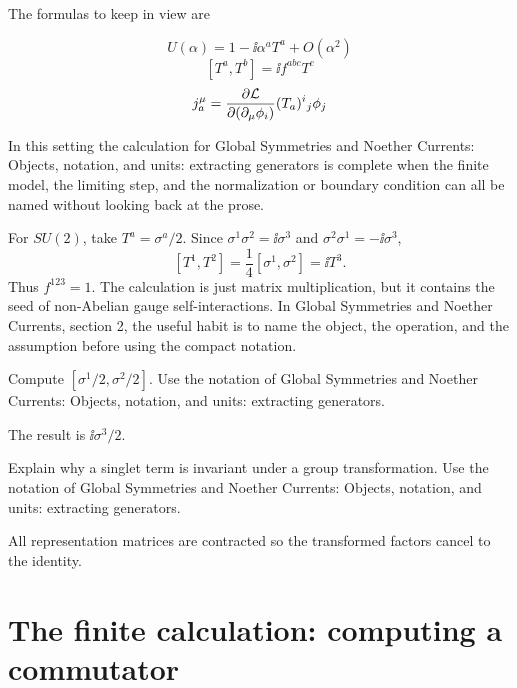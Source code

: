 The formulas to keep in view are

\[
  U(\alpha)=1-\ii\alpha^aT^a+O(\alpha^2)
\]
\[
  [T^a,T^b]=\ii f^{abc}T^c
\]
\[
  j^\mu_a=\frac{\partial\mathcal L}{\partial(\partial_\mu\phi_i)}(T_a)^i{}_j\phi_j
\]

In this setting the calculation for Global Symmetries and Noether Currents: Objects, notation, and units: extracting generators is complete when the finite model, the limiting step, and the normalization or boundary condition can all be named without looking back at the prose.




\begin{example}
For \(SU(2)\), take \(T^a=\sigma^a/2\).  Since \(\sigma^1\sigma^2=\ii\sigma^3\) and \(\sigma^2\sigma^1=-\ii\sigma^3\),
\[
  [T^1,T^2]=\frac14[\sigma^1,\sigma^2]=\ii T^3.
\]
Thus \(f^{123}=1\).  The calculation is just matrix multiplication, but it contains the seed of non-Abelian gauge self-interactions.  In Global Symmetries and Noether Currents, section 2, the useful habit is to name the object, the operation, and the assumption before using the compact notation.
\end{example}



\begin{exercise}
Compute \([\sigma^1/2,\sigma^2/2]\).  Use the notation of Global Symmetries and Noether Currents: Objects, notation, and units: extracting generators.
\begin{answer}
The result is \(\ii\sigma^3/2\).
\end{answer}
\end{exercise}

\begin{exercise}
Explain why a singlet term is invariant under a group transformation.  Use the notation of Global Symmetries and Noether Currents: Objects, notation, and units: extracting generators.
\begin{answer}
All representation matrices are contracted so the transformed factors cancel to the identity.
\end{answer}
\end{exercise}



\section{The finite calculation: computing a commutator}

